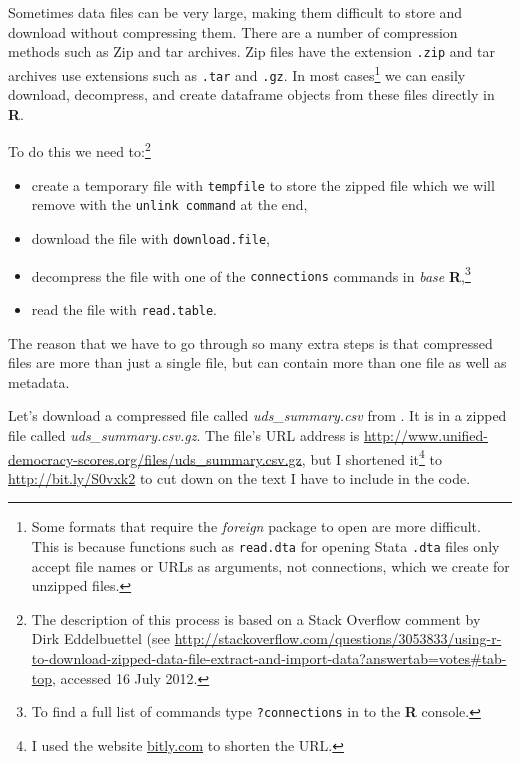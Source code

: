 \documentclass[ChapterTOCs,krantz1]{krantz}\usepackage{graphicx, color}
\begin{document}
Sometimes data files can be very large, making them difficult to store and download without compressing them. There are a number of compression methods such as Zip and tar archives. Zip files have the extension {\tt{.zip}} and tar archives use extensions such as {\tt{.tar}} and {\tt{.gz}}. In most cases\footnote{Some formats that require the {\emph{foreign}} package to open are more difficult. This is because functions such as {\tt{read.dta}} for opening Stata {\tt{.dta}} files only accept file names or URLs as arguments, not connections, which we create for unzipped files.} we can easily download, decompress, and create dataframe objects from these files directly in {\bf{R}}. 

To do this we need to:\footnote{The description of this process is based on a Stack Overflow comment by Dirk Eddelbuettel (see {\url{http://stackoverflow.com/questions/3053833/using-r-to-download-zipped-data-file-extract-and-import-data?answertab=votes\#tab-top}}, accessed 16 July 2012.}

\begin{itemize}
    \item create a temporary file with {\tt{tempfile}} to store the zipped file which we will remove with the {\tt{unlink command}} at the end,
    \item download the file with {\tt{download.file}},
    \item decompress the file with one of the {\tt{connections}} commands in {\emph{base}} {\bf{R}},\footnote{To find a full list of commands type {\tt{?connections}} in to the {\bf{R}} console.}
    \item read the file with {\tt{read.table}}. 
\end{itemize}

The reason that we have to go through so many extra steps is that compressed files are more than just a single file, but can contain more than one file as well as metadata.

Let's download a compressed file called {\emph{uds\_summary.csv}} from \cite{Pemstein2010}. It is in a zipped file called {\emph{uds\_summary.csv.gz}}. The file's URL address is {\url{http://www.unified-democracy-scores.org/files/uds_summary.csv.gz}}, but I shortened it\footnote{I used the website \url{bitly.com} to shorten the URL.} to \url{http://bit.ly/S0vxk2} to cut down on the text I have to include in the code.
\end{document}
